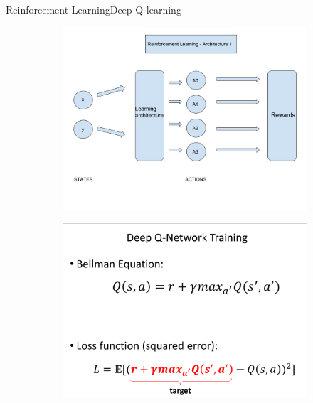 \documentclass[10pt]{beamer}
\begin{document}
\begin{frame}{Reinforcement Learning}{Deep Q learning}
\begin{figure}[!htb]
\centering
\begin{subfigure}[t]{0.5\linewidth}
\includegraphics[width=1.3\textwidth]{assets/train.jpg}
\end{subfigure}
\begin{subfigure}[t]{0.5\linewidth}
\includegraphics[width=1.3\textwidth]{assets/bellman_equation.png}
\end{subfigure}
\vspace{0.1in}
\label{fig:tripEmb}
\end{figure}
\end{frame}
\end{document}
